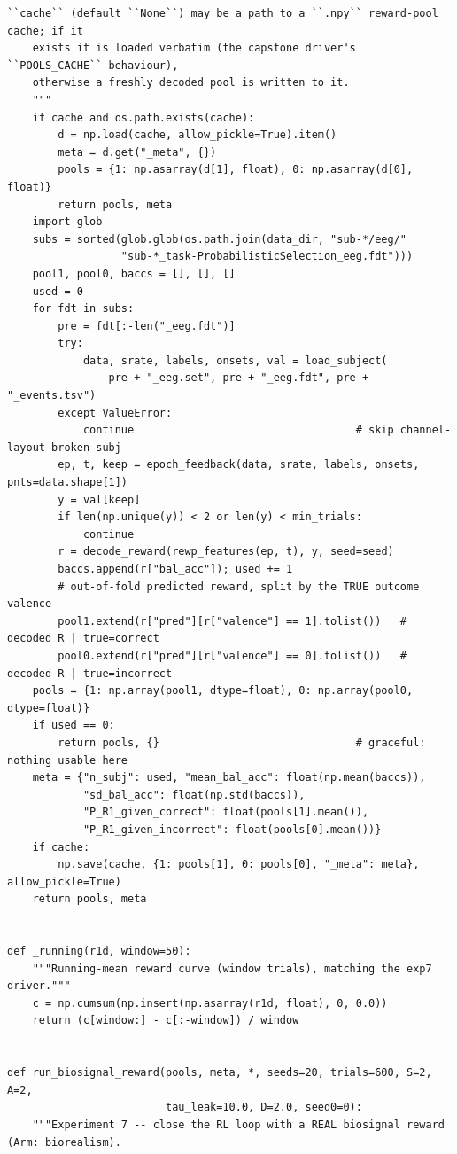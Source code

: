 \begin{lstlisting}[caption={mrl\_trace/biosignal.py},label={lst:siox-src-biosignal}]
    ``cache`` (default ``None``) may be a path to a ``.npy`` reward-pool cache; if it
    exists it is loaded verbatim (the capstone driver's ``POOLS_CACHE`` behaviour),
    otherwise a freshly decoded pool is written to it.
    """
    if cache and os.path.exists(cache):
        d = np.load(cache, allow_pickle=True).item()
        meta = d.get("_meta", {})
        pools = {1: np.asarray(d[1], float), 0: np.asarray(d[0], float)}
        return pools, meta
    import glob
    subs = sorted(glob.glob(os.path.join(data_dir, "sub-*/eeg/"
                  "sub-*_task-ProbabilisticSelection_eeg.fdt")))
    pool1, pool0, baccs = [], [], []
    used = 0
    for fdt in subs:
        pre = fdt[:-len("_eeg.fdt")]
        try:
            data, srate, labels, onsets, val = load_subject(
                pre + "_eeg.set", pre + "_eeg.fdt", pre + "_events.tsv")
        except ValueError:
            continue                                   # skip channel-layout-broken subj
        ep, t, keep = epoch_feedback(data, srate, labels, onsets, pnts=data.shape[1])
        y = val[keep]
        if len(np.unique(y)) < 2 or len(y) < min_trials:
            continue
        r = decode_reward(rewp_features(ep, t), y, seed=seed)
        baccs.append(r["bal_acc"]); used += 1
        # out-of-fold predicted reward, split by the TRUE outcome valence
        pool1.extend(r["pred"][r["valence"] == 1].tolist())   # decoded R | true=correct
        pool0.extend(r["pred"][r["valence"] == 0].tolist())   # decoded R | true=incorrect
    pools = {1: np.array(pool1, dtype=float), 0: np.array(pool0, dtype=float)}
    if used == 0:
        return pools, {}                               # graceful: nothing usable here
    meta = {"n_subj": used, "mean_bal_acc": float(np.mean(baccs)),
            "sd_bal_acc": float(np.std(baccs)),
            "P_R1_given_correct": float(pools[1].mean()),
            "P_R1_given_incorrect": float(pools[0].mean())}
    if cache:
        np.save(cache, {1: pools[1], 0: pools[0], "_meta": meta}, allow_pickle=True)
    return pools, meta


def _running(r1d, window=50):
    """Running-mean reward curve (window trials), matching the exp7 driver."""
    c = np.cumsum(np.insert(np.asarray(r1d, float), 0, 0.0))
    return (c[window:] - c[:-window]) / window


def run_biosignal_reward(pools, meta, *, seeds=20, trials=600, S=2, A=2,
                         tau_leak=10.0, D=2.0, seed0=0):
    """Experiment 7 -- close the RL loop with a REAL biosignal reward (Arm: biorealism).


\end{lstlisting}
